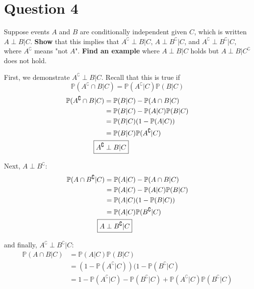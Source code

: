 \documentclass[titlepage, 12pt, leqno]{article}
\begin{document}
\section{Question 4}
\begin{ex}
    Suppose events $A$ and $B$ are conditionally independent given $C$, which is
    written $A \perp B | C$. \textbf{Show} that this implies that $A^\complement 
    \perp B |C$, $A \perp B^\complement | C$, and $A^\complement \perp 
    B^\complement | C$, where $A^\complement $ means "not $A$". \textbf{Find an
    example} where $A \perp B | C$ holds but $A \perp B | C^\complement$ does not
    hold.
\end{ex}
First, we demonstrate $A^\complement \perp B|C$. Recall that this is
true if 
\[
\mathbb{P}(A^\complement \cap B |C) = \mathbb{P}(A^\complement |C)
\mathbb{P}(B|C)
\]
\begin{align*}
    \mathbb{P}(A^\complement \cap B|C) &= \mathbb{P}(B|C) - 
    \mathbb{P}(A \cap B|C)\\
                                       &= \mathbb{P}(B|C)-\mathbb{P}(A|C)
                                       \mathbb{P}(B|C) \\
                                       &= \mathbb{P}(B|C)(1-\mathbb{P}(
                                       A|C)) \\
                                       &= \mathbb{P}(B|C)\mathbb{P}(
                                       A^\complement |C) \\
    \Aboxed{A^\complement &\perp B|C} 
\end{align*}

Next, $A \perp B^\complement$:
\begin{align*}
    \mathbb{P}(A \cap B^\complement |C) &= \mathbb{P}(A|C)-\mathbb{P}(A\cap B|C)\\
                                        &= \mathbb{P}(A|C)-\mathbb{P}(A|C)
                                        \mathbb{P}(B|C) \\
                                        &= \mathbb{P}(A|C)(1-\mathbb{P}(B|C))\\
                                        &= \mathbb{P}(A|C)\mathbb{P}(
                                        B^\complement |C)\\
    \Aboxed{A &\perp B^\complement |C} 
\end{align*}

and finally, $A^\complement \perp B^\complement |C$:
\begin{align*}
    \mathbb{P}(A \cap B|C) &= \mathbb{P}(A|C)\mathbb{P}(B|C)\\
                           &= (1-\mathbb{P}(A^\complement |C))(1-\mathbb{P}(
                           B^\complement |C)\\
                           &= 1 - \mathbb{P}(A^\complement |C)-\mathbb{P}(
                           B^\complement |C)+\mathbb{P}(A^\complement |C)
                           \mathbb{P}(B^\complement |C)
\end{align*}
\end{document}
